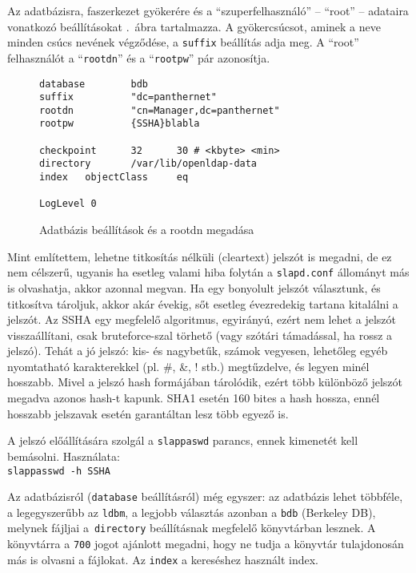 Az adatbázisra,  faszerkezet gyökerére és a ``szuperfelhasználó'' -- ``root'' -- adataira vonatkozó beállításokat
.\ ábra tartalmazza. A gyökercsúcsot, aminek a neve minden csúcs nevének végződése, a
\texttt{suffix} beállítás adja meg. A ``root'' felhasználót a ``\texttt{rootdn}'' és a ``\texttt{rootpw}'' pár
azonosítja. 

\begin{figure}
\begin{Verbatim}[frame=single]
database        bdb
suffix          "dc=panthernet"
rootdn          "cn=Manager,dc=panthernet"
rootpw          {SSHA}blabla

checkpoint      32      30 # <kbyte> <min>
directory       /var/lib/openldap-data
index   objectClass     eq

LogLevel 0
\end{Verbatim}
  \caption{Adatbázis beállítások és a rootdn megadása}
  \label{fig:ldap-db}
\end{figure}

Mint említettem, lehetne titkosítás nélküli (cleartext) jelszót is megadni, de ez nem
célszerű, ugyanis ha esetleg valami hiba folytán a \texttt{slapd.conf} állományt más is olvashatja, akkor azonnal
megvan. Ha egy bonyolult jelszót választunk, és titkosítva tároljuk, akkor akár évekig, sőt esetleg évezredekig
tartana kitalálni a jelszót. Az \textsc{SSHA} egy megfelelő algoritmus, egyirányú, ezért
nem lehet a jelszót visszaállítani, csak bruteforce-szal törhető (vagy szótári támadással, ha rossz a jelszó). Tehát a
jó jelszó: kis-  és nagybetűk, számok vegyesen, lehetőleg egyéb nyomtatható karakterekkel (pl. \#, \&, ! stb.)
megtűzdelve, és legyen minél hosszabb. Mivel a jelszó hash formájában tárolódik, ezért több különböző jelszót megadva
azonos hash-t kapunk. \textsc{SHA1} esetén 160 bites a hash hossza, ennél hosszabb jelszavak esetén garantáltan lesz több
egyező is.

A jelszó előállítására szolgál a \texttt{slappaswd} parancs, ennek kimenetét kell bemásolni. Használata:\\
\texttt{slappasswd -h {SSHA}}






Az adatbázisról (\texttt{database} beállításról) még egyszer: az adatbázis lehet többféle, a legegyszerűbb az
\texttt{ldbm}, a legjobb választás azonban a  \texttt{bdb} (Berkeley DB), melynek fájljai a~\texttt{directory}
beállításnak megfelelő könyvtárban lesznek. A könyvtárra a \texttt{700} jogot ajánlott megadni, hogy ne tudja a
könyvtár tulajdonosán más is olvasni a fájlokat. Az  \texttt{index} a  kereséshez használt index.


